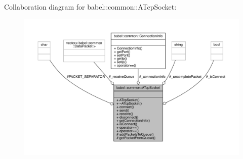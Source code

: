 Collaboration diagram for babel\+:\+:common\+:\+:A\+Tcp\+Socket\+:\nopagebreak
\begin{figure}[H]
\begin{center}
\leavevmode
\includegraphics[width=350pt]{classbabel_1_1common_1_1_a_tcp_socket__coll__graph}
\end{center}
\end{figure}

